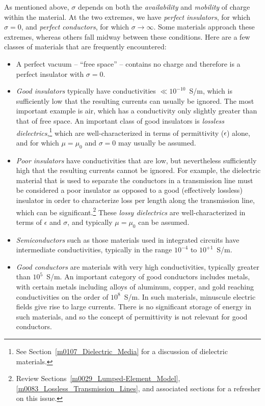 As mentioned above, $\sigma$ depends on both the \emph{availability} and \emph{mobility} of charge within the material.  
At the two extremes, we have \emph{perfect insulators}, 
for which $\sigma=0$, and \emph{perfect conductors}, 
for which $\sigma \to \infty$.  
Some materials approach these extremes, whereas others fall midway between these conditions.  
Here are a few classes of materials that are frequently encountered:
%
\begin{itemize}

\item A perfect vacuum -- ``free space'' -- contains no charge and therefore is a perfect insulator with $\sigma=0$. 

\item \emph{Good insulators} typically have conductivities $\ll 10^{-10}$~S/m, which is sufficiently low that the resulting currents can usually be ignored.  The most important example is air, which has a conductivity only slightly greater than that of free space.  An important class of good insulators is {\it lossless dielectrics},\footnote{See Section~\ref{m0107_Dielectric_Media} 
for a discussion of dielectric materials.} which are well-characterized in terms of permittivity
($\epsilon$) alone, and for which $\mu=\mu_0$ and $\sigma=0$ may usually be assumed. 

\item \emph{Poor insulators} 
have conductivities that are low, but nevertheless sufficiently high that the resulting currents cannot be ignored.  For example, the dielectric material that is used to separate the conductors in a transmission line must be considered a poor insulator as opposed to a good (effectively lossless) insulator in order to characterize loss per length along the transmission line, which can be significant.\footnote{Review Sections~\ref{m0029_Lumped-Element_Model}, \ref{m0083_Lossless_Transmission_Lines}, and associated sections for a refresher on this issue.}
These \emph{lossy dielectrics} 
are well-characterized in terms of $\epsilon$ and $\sigma$, and typically $\mu=\mu_0$ can be assumed. 

\item \emph{Semiconductors} 
such as those materials used in integrated circuits have intermediate conductivities, typically in the range $10^{-4}$ to $10^{+1}$~S/m.

\item \emph{Good conductors} 
are materials with very high conductivities, typically greater than $10^5$~S/m.  
An important category of good conductors includes metals, with certain metals including alloys of aluminum, copper, and gold reaching conductivities on the order of $10^8$~S/m. 
In such materials, minuscule electric fields give rise to large currents.   
There is no significant storage of energy in such materials, and so the concept of permittivity is not relevant for good conductors. 

\end{itemize}

